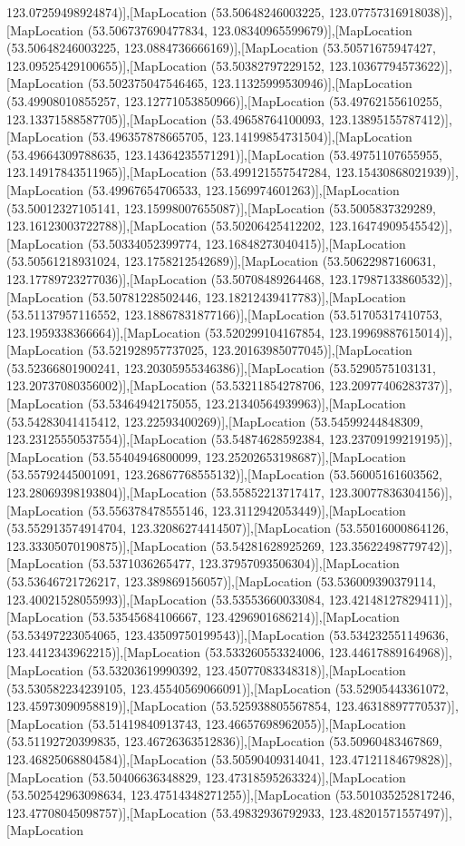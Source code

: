 123.07259498924874)],[MapLocation (53.50648246003225, 123.07757316918038)],[MapLocation (53.506737690477834, 123.08340965599679)],[MapLocation (53.50648246003225, 123.0884736666169)],[MapLocation (53.50571675947427, 123.09525429100655)],[MapLocation (53.50382797229152, 123.10367794573622)],[MapLocation (53.502375047546465, 123.11325999530946)],[MapLocation (53.49908010855257, 123.12771053850966)],[MapLocation (53.49762155610255, 123.13371588587705)],[MapLocation (53.49658764100093, 123.13895155787412)],[MapLocation (53.496357878665705, 123.14199854731504)],[MapLocation (53.49664309788635, 123.14364235571291)],[MapLocation (53.49751107655955, 123.14917843511965)],[MapLocation (53.499121557547284, 123.15430868021939)],[MapLocation (53.49967654706533, 123.1569974601263)],[MapLocation (53.50012327105141, 123.15998007655087)],[MapLocation (53.5005837329289, 123.16123003722788)],[MapLocation (53.50206425412202, 123.16474909545542)],[MapLocation (53.50334052399774, 123.16848273040415)],[MapLocation (53.50561218931024, 123.1758212542689)],[MapLocation (53.50622987160631, 123.17789723277036)],[MapLocation (53.50708489264468, 123.17987133860532)],[MapLocation (53.50781228502446, 123.18212439417783)],[MapLocation (53.51137957116552, 123.18867831877166)],[MapLocation (53.51705317410753, 123.1959338366664)],[MapLocation (53.520299104167854, 123.19969887615014)],[MapLocation (53.521928957737025, 123.20163985077045)],[MapLocation (53.52366801900241, 123.20305955346386)],[MapLocation (53.5290575103131, 123.20737080356002)],[MapLocation (53.53211854278706, 123.20977406283737)],[MapLocation (53.53464942175055, 123.21340564939963)],[MapLocation (53.54283041415412, 123.22593400269)],[MapLocation (53.54599244848309, 123.23125550537554)],[MapLocation (53.54874628592384, 123.23709199219195)],[MapLocation (53.55404946800099, 123.25202653198687)],[MapLocation (53.55792445001091, 123.26867768555132)],[MapLocation (53.56005161603562, 123.28069398193804)],[MapLocation (53.55852213717417, 123.30077836304156)],[MapLocation (53.556378478555146, 123.3112942053449)],[MapLocation (53.552913574914704, 123.32086274414507)],[MapLocation (53.55016000864126, 123.33305070190875)],[MapLocation (53.54281628925269, 123.35622498779742)],[MapLocation (53.5371036265477, 123.37957093506304)],[MapLocation (53.53646721726217, 123.389869156057)],[MapLocation (53.536009390379114, 123.40021528055993)],[MapLocation (53.53553660033084, 123.42148127829411)],[MapLocation (53.53545684106667, 123.4296901686214)],[MapLocation (53.53497223054065, 123.43509750199543)],[MapLocation (53.534232551149636, 123.4412343962215)],[MapLocation (53.533260553324006, 123.44617889164968)],[MapLocation (53.53203619990392, 123.45077083348318)],[MapLocation (53.530582234239105, 123.45540569066091)],[MapLocation (53.52905443361072, 123.45973090958819)],[MapLocation (53.525938805567854, 123.46318897770537)],[MapLocation (53.51419840913743, 123.46657698962055)],[MapLocation (53.51192720399835, 123.46726363512836)],[MapLocation (53.50960483467869, 123.46825068804584)],[MapLocation (53.50590409314041, 123.47121184679828)],[MapLocation (53.50406636348829, 123.47318595263324)],[MapLocation (53.502542963098634, 123.47514348271255)],[MapLocation (53.501035252817246, 123.47708045098757)],[MapLocation (53.49832936792933, 123.48201571557497)],[MapLocation 
